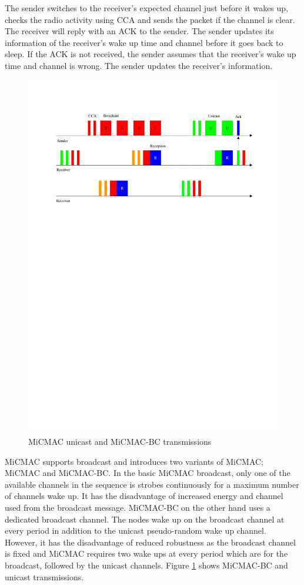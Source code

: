 The sender switches to the receiver's expected channel just before it wakes up, checks the radio activity using CCA and sends the packet if the channel is clear. The receiver will reply with an ACK to the sender. The sender updates its information of the receiver's wake up time and channel before it goes back to sleep. If the ACK is not received, the sender assumes that the receiver's wake up time and channel is wrong. The sender updates the receiver's information. 

\begin{figure}
\centering
\includegraphics[trim=2cm 19cm 1cm 2cm, clip=true, totalheight=0.30\textheight]{micmac.pdf}
\caption{MiCMAC unicast and MiCMAC-BC transmissions}
\label{fig_micmac}
\end{figure}

MiCMAC supports broadcast and introduces two variants of MiCMAC; MiCMAC and MiCMAC-BC. In the basic MiCMAC broadcast, only one of the available channels in the sequence is strobes continuously for a maximum number of channels wake up. It has the disadvantage of increased energy and channel used from the broadcast message. MiCMAC-BC on the other hand uses a dedicated broadcast channel. The nodes wake up on the broadcast channel at every period in addition to the unicast pseudo-random wake up channel. However, it has the disadvantage of reduced robustness as the broadcast channel is fixed and MiCMAC requires two wake ups at every period which are for the broadcast, followed by the unicast channels. Figure \ref{fig_micmac} shows MiCMAC-BC and unicast transmissions.

